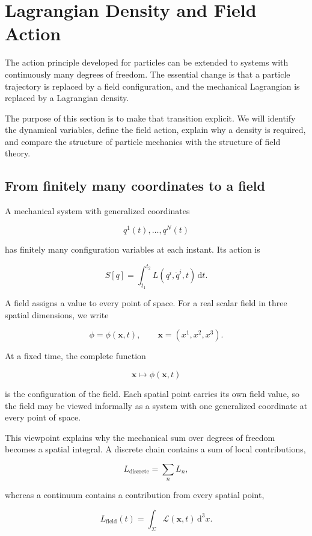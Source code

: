 \section{Lagrangian Density and Field Action}
\label{sec:lagrangian_density_and_field_action}

The action principle developed for particles can be extended to systems with continuously many degrees of freedom. The essential change is that a particle trajectory is replaced by a field configuration, and the mechanical Lagrangian is replaced by a Lagrangian density.

The purpose of this section is to make that transition explicit. We will identify the dynamical variables, define the field action, explain why a density is required, and compare the structure of particle mechanics with the structure of field theory.

\subsection{From finitely many coordinates to a field}

A mechanical system with generalized coordinates

\[
q^{1}(t),\ldots,q^{N}(t)
\]

has finitely many configuration variables at each instant. Its action is

\[
S[q]
=
\int_{t_{1}}^{t_{2}}
L(q^{i},\dot q^{i},t)
\,\mathrm{d}t.
\]

A field assigns a value to every point of space. For a real scalar field in three spatial dimensions, we write

\[
\phi=\phi(\mathbf{x},t),
\qquad
\mathbf{x}=(x^{1},x^{2},x^{3}).
\]

At a fixed time, the complete function

\[
\mathbf{x}\longmapsto\phi(\mathbf{x},t)
\]

is the configuration of the field. Each spatial point carries its own field value, so the field may be viewed informally as a system with one generalized coordinate at every point of space.

This viewpoint explains why the mechanical sum over degrees of freedom becomes a spatial integral. A discrete chain contains a sum of local contributions,

\[
L_{\mathrm{discrete}}
=
\sum_{n}L_{n},
\]

whereas a continuum contains a contribution from every spatial point,

\[
L_{\mathrm{field}}(t)
=
\int_{\Sigma}
\mathcal{L}(\mathbf{x},t)
\,\mathrm{d}^{3}x.
\]

